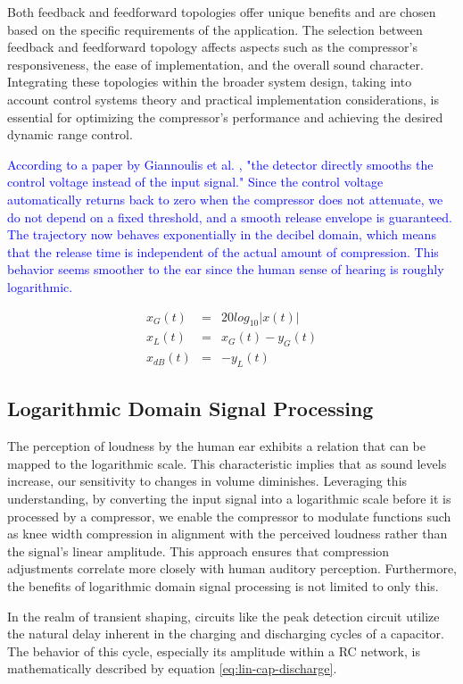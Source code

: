 \documentclass[10pt]{article}
\begin{document}
\begin{multicols*}{2}
                Both feedback and feedforward topologies offer unique benefits and are chosen based on the specific requirements of the application. The selection between feedback and feedforward topology affects aspects such as the compressor's responsiveness, the ease of implementation, and the overall sound character. Integrating these topologies within the broader system design, taking into account control systems theory and practical implementation considerations, is essential for optimizing the compressor's performance and achieving the desired dynamic range control.\par
                \textcolor{blue}{According to a paper by Giannoulis et al. \cite{drc-tutorial}, "the detector directly smooths the control voltage instead of the input signal." Since the control voltage automatically returns back to zero when the compressor does not attenuate, we do not depend on a fixed threshold, and a smooth release envelope is guaranteed. The trajectory now behaves exponentially in the decibel domain, which means that the release time is independent of the actual amount of compression. This behavior seems smoother to the ear since the human sense of hearing is roughly logarithmic.} 

                    \begin{eqnarray}
                        x_G(t)&=&20log_{10}|x(t)|\\
                        x_L(t)&=&x_G(t)-y_G(t)\\
                        x_{dB}(t)&=&-y_L(t)
                    \end{eqnarray}
    
            \subsection{Logarithmic Domain Signal Processing}
                The perception of loudness by the human ear exhibits a relation that can be mapped to the logarithmic scale. This characteristic implies that as sound levels increase, our sensitivity to changes in volume diminishes. Leveraging this understanding, by converting the input signal into a logarithmic scale before it is processed by a compressor, we enable the compressor to modulate functions such as knee width compression in alignment with the perceived loudness rather than the signal's linear amplitude. This approach ensures that compression adjustments correlate more closely with human auditory perception. Furthermore, the benefits of logarithmic domain signal processing is not limited to only this.\par
                In the realm of transient shaping, circuits like the peak detection circuit utilize the natural delay inherent in the charging and discharging cycles of a capacitor. The behavior of this cycle, especially its amplitude within a RC network, is mathematically described by equation \ref{eq:lin-cap-discharge}.
                

\end{multicols*}
\end{document}
